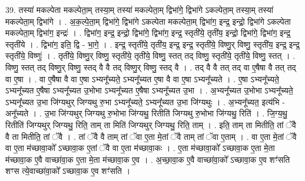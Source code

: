 \documentclass[17pt]{extarticle}
\begin{document}
39. तस्या॑ मकल्पेता मकल्पेता॒म् तस्या॒म् तस्या॑ मकल्पेता॒म् द्विभा॑गे॒ द्विभा॑गे ऽकल्पेता॒म् तस्या॒म् तस्या॑ मकल्पेता॒म् द्विभा॑गे । . अ॒क॒ल्पे॒ता॒म् द्विभा॑गे॒ द्विभा॑गे ऽकल्पेता मकल्पेता॒म् द्विभा॑ग॒ इन्द्र॒ इन्द्रो॒ द्विभा॑गे ऽकल्पेता मकल्पेता॒म् द्विभा॑ग॒ इन्द्रः॑ । . द्विभा॑ग॒ इन्द्र॒ इन्द्रो॒ द्विभा॑गे॒ द्विभा॑ग॒ इन्द्र॒ स्तृती॑ये॒ तृती॑य॒ इन्द्रो॒ द्विभा॑गे॒ द्विभा॑ग॒ इन्द्र॒ स्तृती॑ये । . द्विभा॑ग॒ इति॒ द्वि - भा॒गे॒ । . इन्द्र॒ स्तृती॑ये॒ तृती॑य॒ इन्द्र॒ इन्द्र॒ स्तृती॑ये॒ विष्णु॒र् विष्णु॒ स्तृती॑य॒ इन्द्र॒ इन्द्र॒ स्तृती॑ये॒ विष्णुः॑ । . तृती॑ये॒ विष्णु॒र् विष्णु॒ स्तृती॑ये॒ तृती॑ये॒ विष्णु॒ स्तत् तद् विष्णु॒ स्तृती॑ये॒ तृती॑ये॒ विष्णु॒ स्तत् । . विष्णु॒ स्तत् तद् विष्णु॒र् विष्णु॒ स्तद् वै वै तद् विष्णु॒र् विष्णु॒ स्तद् वै । . तद् वै वै तत् तद् वा ए॒षैषा वै तत् तद् वा ए॒षा । . वा ए॒षैषा वै वा ए॒षा ऽभ्यनू᳚च्यते॒ ऽभ्यनू᳚च्यत ए॒षा वै वा ए॒षा ऽभ्यनू᳚च्यते । . ए॒षा ऽभ्यनू᳚च्यते॒ ऽभ्यनू᳚च्यत ए॒षैषा ऽभ्यनू᳚च्यत उ॒भोभा ऽभ्यनू᳚च्यत ए॒षैषा ऽभ्यनू᳚च्यत उ॒भा । . अ॒भ्यनू᳚च्यत उ॒भोभा ऽभ्यनू᳚च्यते॒ ऽभ्यनू᳚च्यत उ॒भा जि॑ग्यथुर् जिग्यथु रु॒भा ऽभ्यनू᳚च्यते॒ ऽभ्यनू᳚च्यत उ॒भा जि॑ग्यथुः । . अ॒भ्यनू᳚च्यत॒ इत्य॑भि - अनू᳚च्यते । . उ॒भा जि॑ग्यथुर् जिग्यथु रु॒भोभा जि॑ग्यथु॒ रितीति॑ जिग्यथु रु॒भोभा जि॑ग्यथु॒ रिति॑ । . जि॒ग्य॒थु॒ रितीति॑ जिग्यथुर् जिग्यथु॒ रिति॒ ताम् ता मिति॑ जिग्यथुर् जिग्यथु॒ रिति॒ ताम् । . इति॒ ताम् ता मितीति॒ तां ॅवै वै ता मितीति॒ तां ॅवै । . तां ॅवै वै ताम् तां ॅवा ए॒ता मे॒तां ॅवै ताम् तां ॅवा ए॒ताम् । . वा ए॒ता मे॒तां ॅवै वा ए॒ता म॑च्छावा॒को᳚ ऽच्छावा॒क ए॒तां ॅवै वा ए॒ता म॑च्छावा॒कः । . ए॒ता म॑च्छावा॒को᳚ ऽच्छावा॒क ए॒ता मे॒ता म॑च्छावा॒क ए॒वै वाच्छा॑वा॒क ए॒ता मे॒ता म॑च्छावा॒क ए॒व । . अ॒च्छा॒वा॒क ए॒वै वाच्छा॑वा॒को᳚ ऽच्छावा॒क ए॒व शꣳ॑सति शꣳस त्ये॒वाच्छा॑वा॒को᳚ ऽच्छावा॒क ए॒व शꣳ॑सति । \newline
\pagebreak
{}
\end{document}
